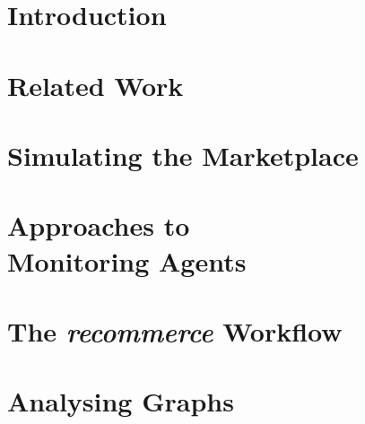 \documentclass
[
    twoside,                 %
    openright,               %
    cleardoublepage = empty, %
    fontsize = 12 pt,        %
    british,                 %
    captions = tableheading, %
    numbers = noenddot,      %
    footheight = 35 pt,      %
]
{scrbook}
\begin{document}
\frontmatter


\pagestyle{plain}





% 

\setcounter{tocdepth}{1}
\tableofcontents

\pagestyle{headings}
\mainmatter


% 

\chapter{Introduction}


\chapter{Related Work}


\chapter{Simulating the Marketplace}


\chapter[Approaches to Monitoring Agents]{Approaches to\\Monitoring Agents}


\chapter{The \emph{recommerce} Workflow}


\chapter{Analysing Graphs}

\end{document}
